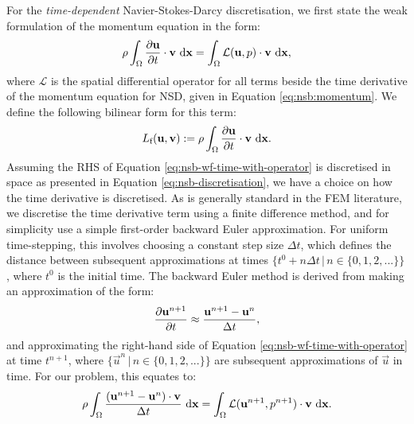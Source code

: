             For the \textit{time-dependent} Navier-Stokes-Darcy discretisation, we first state the weak formulation of the momentum equation in the form:
            \begin{equation}
                \rho \int_\Omega \pdv{\boldsymbol{\mathbf{u}}}{t} \cdot \boldsymbol{\mathbf{v}} ~\mathrm{d}\boldsymbol{\mathbf{x}} = \int_\Omega \mathcal{L}(\boldsymbol{\mathbf{u}}, p) \cdot \boldsymbol{\mathbf{v}} ~\mathrm{d} \boldsymbol{\mathbf{x}},
                \label{eq:nsb-wf-time-with-operator}
            \end{equation}
            where $\mathcal{L}$ is the spatial differential operator for all terms beside the time derivative of the momentum equation for NSD, given in Equation \eqref{eq:nsb:momentum}. We define the following bilinear form for this term:
            \begin{equation}
                L_\text{f}(\boldsymbol{\mathbf{u}}, \boldsymbol{\mathbf{v}}) := \rho \int_{\Omega} \pdv{\boldsymbol{\mathbf{u}}}{t} \cdot \boldsymbol{\mathbf{v}} ~\mathrm{d}\boldsymbol{\mathbf{x}}.
                \label{eq:nsb-wf-time}
            \end{equation}%
            Assuming the RHS of Equation \eqref{eq:nsb-wf-time-with-operator} is discretised in space as presented in Equation \eqref{eq:nsb-discretisation}, we have a choice on how the time derivative is discretised. As is generally standard in the FEM literature, we discretise the time derivative term using a finite difference method, and for simplicity use a simple first-order backward Euler approximation. For uniform time-stepping, this involves choosing a constant step size $\Delta t$, which defines the distance between subsequent approximations at times $\{ t^0 + n \Delta t \, | \, n \in \{0, 1, 2, ...\} \}$, where $t^0$ is the initial time. The backward Euler method is derived from making an approximation of the form:
            \begin{equation}
                \pdv{\boldsymbol{\mathbf{u}}^{n+1}}{t} \approx \frac{\boldsymbol{\mathbf{u}}^{n+1} - \boldsymbol{\mathbf{u}}^n}{\Delta t},
                \label{eq:first-order-backward-euler}
            \end{equation}
            and approximating the right-hand side of Equation \eqref{eq:nsb-wf-time-with-operator} at time $t^{n+1}$, where $\{ \vec{u}^n \, | \, n \in \{ 0, 1, 2, ... \} \}$ are subsequent approximations of $\vec{u}$ in time. For our problem, this equates to:
            \begin{equation*}
                \rho \int_\Omega \frac{(\boldsymbol{\mathbf{u}}^{n+1} - \boldsymbol{\mathbf{u}}^n) \cdot \boldsymbol{\mathbf{v}}}{\Delta t} ~\mathrm{d} \boldsymbol{\mathbf{x}} = \int_\Omega \mathcal{L}(\boldsymbol{\mathbf{u}}^{n+1}, p^{n+1}) \cdot \boldsymbol{\mathbf{v}} ~\mathrm{d} \boldsymbol{\mathbf{x}}.
            \end{equation*}
